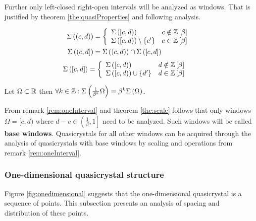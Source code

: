 \documentclass[text.tex]{subfiles}
\begin{document}
\begin{remark}
\label{rem:oneInterval}
Further only left-closed right-open intervals will be analyzed as windows. That is justified by theorem \ref{the:quasiProperties} and following analysis.
%
\begin{multicols}{2}
\noindent\begin{align*}
\Sigma\left((c,d)\right) &= \left\{ 
	\begin{array}{l l}
	\Sigma\left([c,d)\right) & c \notin \mathbb{Z}\left[\beta\right]\\
	\Sigma\left([c,d)\right)\setminus\{c'\} & c \in \mathbb{Z}\left[\beta\right]
	\end{array} \right.\\
\Sigma\left((c,d]\right) &= \Sigma\left((c,d)\right)\cap\Sigma\left([c,d]\right)
\end{align*}
\begin{align*}
\Sigma\left([c,d]\right) &= \left\{ 
	\begin{array}{l l}
	\Sigma\left([c,d)\right) & d \notin \mathbb{Z}\left[\beta\right]\\
	\Sigma\left([c,d)\right)\cup\{d'\} & d \in \mathbb{Z}\left[\beta\right]
	\end{array} \right.
\end{align*}
\end{multicols}
%
\end{remark}

\begin{theorem}
\label{the:scale}
Let $\Omega \subset \mathbb{R}$ then $\forall k\in \mathbb{Z}: \Sigma\left(\frac{1}{\beta^k}\Omega\right) = \beta^k\Sigma\left(\Omega\right)$.
\end{theorem}

\begin{corollary}
\label{cor:baseInterval}
From remark \ref{rem:oneInterval} and theorem \ref{the:scale} follows that only windows $\Omega = [c,d)$ where $d-c\in\left( \frac{1}{\beta}, 1 \right]$ need to be analyzed. Such windows will be called \textbf{base windows}. Quasicrystals for all other windows can be acquired through the analysis of quasicrystals with base windows by scaling and operations from remark \ref{rem:oneInterval}.
\end{corollary}

\subsubsection{One-dimensional quasicrystal structure}%

Figure \ref{fig:onedimensional} suggests that the one-dimensional quasicrystal is a sequence of points. This subsection presents an analysis of spacing and distribution of these points.
\end{document}
